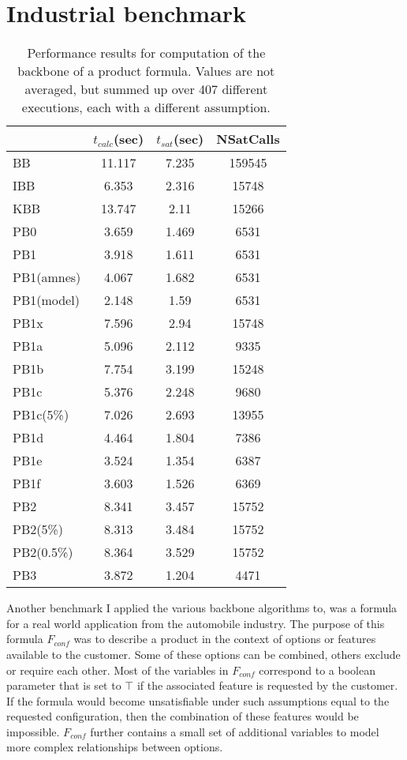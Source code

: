 \section{Industrial benchmark}
\label{sec:sectionVonThore}

\begin{wraptable}[28]{R}{8cm}
\begin{tabular}{l| c c c }
&	$t_{calc}$(sec) &	$t_{sat}$(sec)	& NSatCalls \\
\hline
BB & 11.117 & 7.235 & 159545 \\
IBB & 6.353 & 2.316 & 15748 \\
KBB & 13.747 & 2.11 & 15266 \\
PB0 & 3.659 & 1.469 & 6531 \\
PB1 & 3.918 & 1.611 & 6531 \\
PB1(amnes) & 4.067 & 1.682 & 6531 \\
PB1(model) & 2.148 & 1.59 & 6531 \\
PB1x & 7.596 & 2.94 & 15748 \\
PB1a & 5.096 & 2.112 & 9335 \\
PB1b & 7.754 & 3.199 & 15248 \\
PB1c & 5.376 & 2.248 & 9680 \\
PB1c(5\%) & 7.026 & 2.693 & 13955 \\
PB1d & 4.464 & 1.804 & 7386 \\
PB1e & 3.524 & 1.354 & 6387 \\
PB1f & 3.603 & 1.526 & 6369 \\
PB2 & 8.341 & 3.457 & 15752 \\
PB2(5\%) & 8.313 & 3.484 & 15752 \\
PB2(0.5\%) & 8.364 & 3.529 & 15752 \\
PB3 & 3.872 & 1.204 & 4471 \\
\end{tabular}
\caption{Performance results for computation of the backbone of a product formula. Values are not averaged, but summed up over 407 different executions, each with a different assumption.}
\label{tab:vonThore1}
\end{wraptable}

Another benchmark I applied the various backbone algorithms to, was a formula for a real world application from the automobile industry. The purpose of this formula $F_{conf}$ was to describe a product in the context of options or features available to the customer. Some of these options can be combined, others exclude or require each other. Most of the variables in $F_{conf}$ correspond to a boolean parameter that is set to $\top$ if the associated feature is requested by the customer. If the formula would become unsatisfiable under such assumptions equal to the requested configuration, then the combination of these features would be impossible. $F_{conf}$ further contains a small set of additional variables to model more complex relationships between options.

